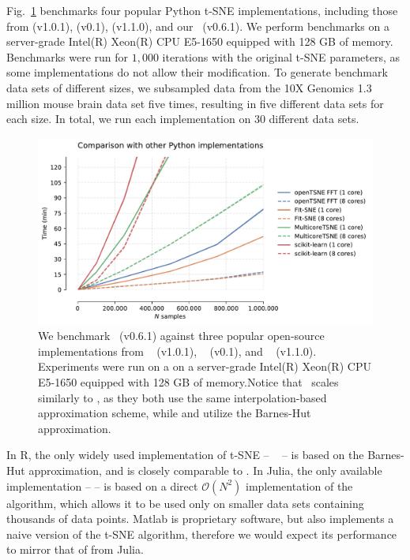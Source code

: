 \documentclass[article]{jss}
\newcommand{\opentsne}{\pkg{openTSNE}}
\begin{document}
Fig.~\ref{fig:benchmarks_py} benchmarks four popular Python t-SNE implementations,
including those from  (v1.0.1),  (v0.1),
 (v1.1.0), and our \opentsne\ (v0.6.1). We perform benchmarks on
a server-grade Intel(R) Xeon(R) CPU E5-1650 equipped with 128 GB of memory. Benchmarks were run for $1,000$ iterations with the original
t-SNE parameters, as some implementations do not allow their modification.
To generate benchmark data sets of different sizes, we subsampled data from the 10X Genomics 1.3 million mouse brain data set five times, resulting in five different data sets for each size. In total, we run each implementation on 30 different data sets. 

\begin{figure}[ht]
  \includegraphics[width=\textwidth]{benchmarks_python}
  \caption{\label{fig:benchmarks_py}
  We benchmark \opentsne\ (v0.6.1) against three popular open-source
  implementations from ~\citep{pedregosa2011scikit}
  (v1.0.1), ~\citep{Ulyanov2016} (v0.1), and
  ~\citep{linderman2019fast} (v1.1.0). Experiments were run on a
  on a server-grade Intel(R) Xeon(R) CPU E5-1650 equipped with 128 GB of memory.Notice
  that \opentsne\ scales similarly to , as they both use the
  same interpolation-based approximation scheme, while  and
   utilize the Barnes-Hut approximation.
}
\end{figure}

In R, the only widely used implementation of t-SNE -- ~\citep{krijthe2015rtsne} -- is based on the Barnes-Hut approximation, and is closely comparable to . In Julia, the only available implementation --  -- is based on a direct $\mathcal{O}(N^2)$ implementation of the algorithm, which allows it to be used only on smaller data sets containing thousands of data points.
Matlab is proprietary software, but also implements a naive version of the t-SNE algorithm, therefore we would expect its performance to mirror that of  from Julia.
\end{document}
